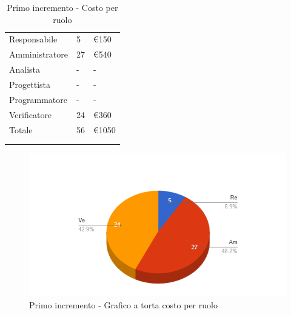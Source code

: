 {{\begin{longtable}{C{.3\freewidth} C{.2\freewidth} C{.2\freewidth}}
        Responsabile & 5 & €150\\        
        Amministratore & 27 & €540\\        
        Analista & - &-\\        
        Progettista&-&-\\        
        Programmatore&-&-\\
        Verificatore&24 & €360\\
        Totale&56&€1050\\
        \bottomrule
        \\
        \caption{Primo incremento - Costo per ruolo}

        \end{longtable}
        \begin{figure}[H]
          \includegraphics[width=15cm]{sezioni/Images/primoT.png}
          \centering
          \caption{Primo incremento - Grafico a torta costo per ruolo}
       \end{figure}
    }
}
  
